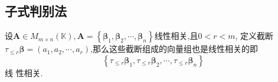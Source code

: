 \subsection{子式判别法}
\begin{green}
\begin{lemma}[截断的线性关系]\label{lem:截断的线性关系}
    设$\bm{A}\in M_{m\times n}\left(\mathbb{K}\right),
    \bm{A}=\left\{
        \bm{\beta}_1,\bm{\beta}_2,\cdots,\bm{\beta}_n
    \right\}$线性相关,且$0 < r < m$,
    定义截断$\tau_{\leqslant r}\bm{\beta}=\left(
        a_1,a_2,\cdots,a_r
    \right)
    $,那么这些截断组成的向量组也是线性相关的即
    \[\left\{\tau_{\leqslant r}\bm{\beta}_1,\tau_{\leqslant r}\bm{\beta}_2,\cdots,
    \tau_{\leqslant r}\bm{\beta}_n\right\}\]线
    性相关.
\end{lemma}
\end{green}
